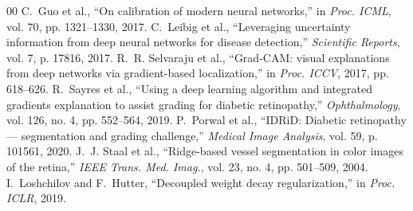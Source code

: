 \documentclass[conference]{IEEEtran}
\begin{document}
\begin{thebibliography}{00}
 C.~Guo et al., ``On calibration of modern neural networks,'' in \textit{Proc. ICML}, vol. 70, pp. 1321--1330, 2017.
 C.~Leibig et al., ``Leveraging uncertainty information from deep neural networks for disease detection,'' \textit{Scientific Reports}, vol. 7, p. 17816, 2017.
 R.~R. Selvaraju et al., ``Grad-CAM: visual explanations from deep networks via gradient-based localization,'' in \textit{Proc. ICCV}, 2017, pp. 618--626.
 R.~Sayres et al., ``Using a deep learning algorithm and integrated gradients explanation to assist grading for diabetic retinopathy,'' \textit{Ophthalmology}, vol. 126, no. 4, pp. 552--564, 2019.
 P.~Porwal et al., ``IDRiD: Diabetic retinopathy --- segmentation and grading challenge,'' \textit{Medical Image Analysis}, vol. 59, p. 101561, 2020.
 J.~J. Staal et al., ``Ridge-based vessel segmentation in color images of the retina,'' \textit{IEEE Trans. Med. Imag.}, vol. 23, no. 4, pp. 501--509, 2004.
 I.~Loshchilov and F.~Hutter, ``Decoupled weight decay regularization,'' in \textit{Proc. ICLR}, 2019.
\end{thebibliography}
\end{document}

